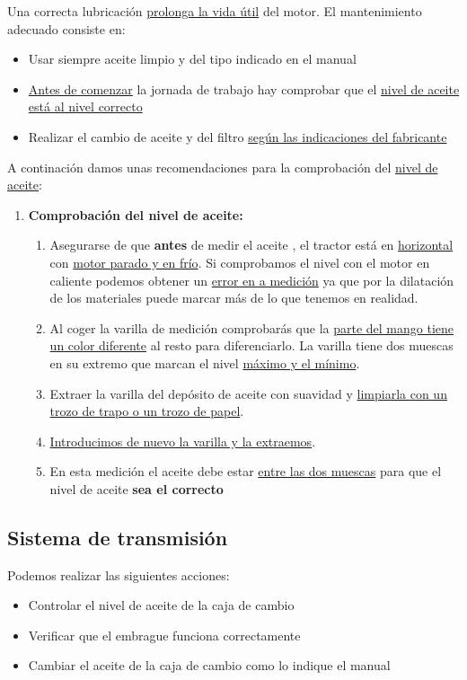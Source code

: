 \documentclass[a4paper,12pt,oneside]{book}
\begin{document}
Una correcta lubricación \uline{prolonga la vida útil} del motor. El mantenimiento
adecuado consiste en:
\begin{itemize}
\item Usar siempre aceite limpio y del tipo indicado en el manual
\item \uline{Antes de comenzar} la jornada de trabajo hay comprobar que el \uline{nivel de 
aceite está al nivel correcto}
\item Realizar el cambio de aceite y del filtro \uline{según las indicaciones del
fabricante}
\end{itemize}

A continación damos unas recomendaciones para la comprobación del \uline{nivel de aceite}:
\begin{enumerate}
\item \textbf{Comprobación del nivel de aceite:}
\label{sec:org9575543}
\begin{enumerate}
\item Asegurarse de que \textbf{antes} de medir el aceite , el tractor está en \uline{horizontal}
con \uline{motor parado y en frío}. Si comprobamos el nivel con el motor en caliente
podemos obtener un \uline{error en a medición} ya que por la dilatación de los
materiales puede marcar más de lo que tenemos en realidad.
\item Al coger la varilla de medición comprobarás que la \uline{parte del mango tiene un 
color diferente} al resto para diferenciarlo. La varilla tiene dos muescas en
su extremo que marcan el nivel \uline{máximo y el mínimo}.
\item Extraer la varilla del depósito de aceite con suavidad y \uline{limpiarla con un
trozo de trapo o un trozo de papel}.
\item \uline{Introducimos de nuevo la varilla y la extraemos}.
\item En esta medición el aceite debe estar \uline{entre las dos muescas} para que el
nivel de aceite \textbf{sea el correcto}
\end{enumerate}
\end{enumerate}

\subsection{Sistema de transmisión}
\label{sec:org0a6ab38}

Podemos realizar las siguientes acciones:
\begin{itemize}
\item Controlar el nivel de aceite de la caja de cambio
\item Verificar que el embrague funciona correctamente
\item Cambiar el aceite de la caja de cambio como lo indique el manual
\end{itemize}
\end{document}
